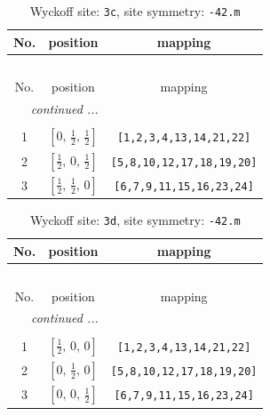 \documentclass[fleqn,8pt]{jsarticle}
\begin{document}
\begin{longtable}{ccc}
\caption{Wyckoff site: {\tt 3c}, site symmetry: {\tt -42.m}}
 \\
 \hline \hline
No. & position & mapping \\ \hline \endfirsthead

\multicolumn{2}{l}{\tablename\ \thetable{}} \\
 \hline \hline
No. & position & mapping \\ \hline \endhead

 \hline \hline
\multicolumn{2}{r}{\footnotesize\it continued ...} \\ \endfoot

 \hline \hline
\multicolumn{2}{r}{} \\ \endlastfoot

1 & $\left[ 0,\, \frac{1}{2},\, \frac{1}{2} \right]$ & {\tt [1,2,3,4,13,14,21,22]} \\ \hline
2 & $\left[ \frac{1}{2},\, 0,\, \frac{1}{2} \right]$ & {\tt [5,8,10,12,17,18,19,20]} \\ \hline
3 & $\left[ \frac{1}{2},\, \frac{1}{2},\, 0 \right]$ & {\tt [6,7,9,11,15,16,23,24]} \\
\end{longtable}
\renewcommand{\arraystretch}{1.2}
\begin{longtable}{ccc}
\caption{Wyckoff site: {\tt 3d}, site symmetry: {\tt -42.m}}
 \\
 \hline \hline
No. & position & mapping \\ \hline \endfirsthead

\multicolumn{2}{l}{\tablename\ \thetable{}} \\
 \hline \hline
No. & position & mapping \\ \hline \endhead

 \hline \hline
\multicolumn{2}{r}{\footnotesize\it continued ...} \\ \endfoot

 \hline \hline
\multicolumn{2}{r}{} \\ \endlastfoot

1 & $\left[ \frac{1}{2},\, 0,\, 0 \right]$ & {\tt [1,2,3,4,13,14,21,22]} \\ \hline
2 & $\left[ 0,\, \frac{1}{2},\, 0 \right]$ & {\tt [5,8,10,12,17,18,19,20]} \\ \hline
3 & $\left[ 0,\, 0,\, \frac{1}{2} \right]$ & {\tt [6,7,9,11,15,16,23,24]} \\
\end{longtable}
\renewcommand{\arraystretch}{1.2}
\end{document}
